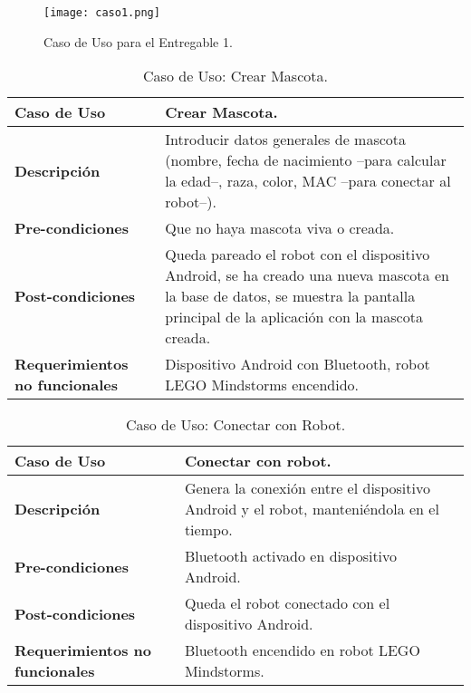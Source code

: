 \begin{figure}[H]
  \centering
  \texttt{[image: caso1.png]}
  \caption[~Caso de Uso Entregable 1]{Caso de Uso para el Entregable 1.}
  \label{fig:Caso1}
\end{figure}

\begin{table}[htbp!]
  \centering
  \begin{tabular}{|p{4cm}|p{6cm}|}\hline
    \bf{Caso de Uso}  & Crear Mascota. \\ \hline
    \bf{Descripci\'on} & Introducir datos generales de mascota (nombre, fecha de nacimiento --para calcular la edad--, raza, color, MAC --para conectar al robot--). \\ \hline
    \bf{Pre-condiciones} &  Que no haya mascota viva o creada. \\ \hline
    \bf{Post-condiciones} & Queda pareado el robot con el dispositivo Android, se ha creado una nueva mascota en la base de datos, se muestra la pantalla principal de la aplicaci\'on con la mascota creada. \\ \hline
    \bf{Requerimientos no funcionales} & Dispositivo Android con Bluetooth, robot LEGO Mindstorms encendido. \\ \hline
  \end{tabular}
  \caption[~Caso de Uso: Crear Mascota]{Caso de Uso: Crear Mascota.}
  \label{table:CrearMascota}
\end{table}

\begin{table}[htbp!]
  \centering
  \begin{tabular}{|p{4cm}|p{6cm}|}\hline
    \bf{Caso de Uso}   & Conectar con robot. \\ \hline
    \bf{Descripci\'on} & Genera la conexi\'on entre el dispositivo Android y el robot, manteni\'endola en el tiempo. \\ \hline
    \bf{Pre-condiciones} & Bluetooth activado en dispositivo Android. \\ \hline
    \bf{Post-condiciones} & Queda el robot conectado con el dispositivo Android. \\ \hline
    \bf{Requerimientos no funcionales} & Bluetooth encendido en robot LEGO Mindstorms.\\ \hline
  \end{tabular}
  \caption[~Caso de Uso: Conectar con Robot]{Caso de Uso: Conectar con Robot.}
  \label{table:ConectarRobot}
\end{table}

